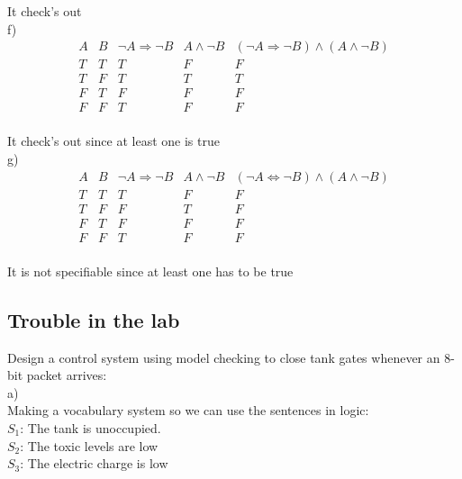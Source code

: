\documentclass{article}
\begin{document}
It check's out\\

f)\\
\begin{displaymath}
\begin{array}{|c|c|c|c|c|c}

A & 
B & 
\neg A \Rightarrow \neg B & 
A \wedge \neg B &
(\neg A \Rightarrow \neg B) \wedge (A \wedge \neg B)\\ %
\hline  %
T & T & T & F & F\\
T & F & T & T & T\\
F & T & F & F & F\\
F & F & T & F & F\\

\end{array}
\end{displaymath}


It check's out since at least one is true\\


g)\\
\begin{displaymath}
\begin{array}{|c|c|c|c|c|c}

A & 
B & 
\neg A \Rightarrow \neg B & 
A \wedge \neg B &
(\neg A \Leftrightarrow \neg B) \wedge (A \wedge \neg B)\\ %
\hline  %
T & T & T & F & F\\
T & F & F & T & F\\
F & T & F & F & F\\
F & F & T & F & F\\


\end{array}
\end{displaymath}


It is not specifiable since at least one has to be true\\


\subsection{Trouble in the lab}


Design a control system using model checking to close tank gates whenever an 8-bit packet arrives:\\

a)\\
Making a vocabulary system so we can use the sentences in logic:\\
$S_1$: The tank is unoccupied.\\
$S_2$: The toxic levels are low\\
$S_3$: The electric charge is low\\
\end{document}
